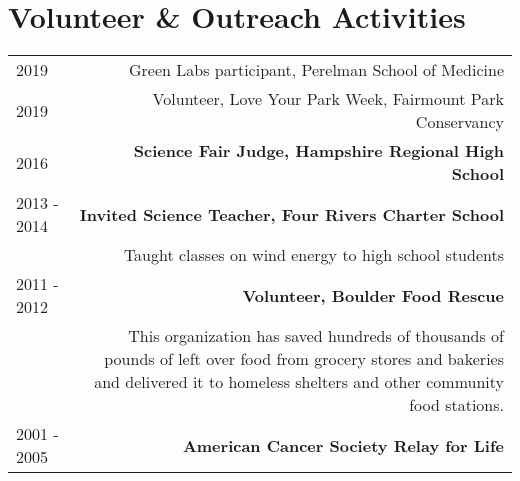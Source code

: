 \section*{Volunteer \& Outreach Activities}
\begin{tabular}{L!{\VRule}R}
2019& Green Labs participant, Perelman School of Medicine\\
2019& Volunteer, Love Your Park Week, Fairmount Park Conservancy\\
2016& {\bf Science Fair Judge, Hampshire Regional High School} \\
2013 - 2014& {\bf Invited Science Teacher, Four Rivers Charter School}\\
& Taught classes on wind energy to high school students\\
2011 - 2012& {\bf Volunteer, Boulder Food Rescue}\\
& This organization has saved hundreds of thousands of pounds of left over food from grocery stores and bakeries and delivered it to homeless shelters and other community food stations. \\
2001 - 2005& {\bf American Cancer Society Relay for Life}\\
\end{tabular}
